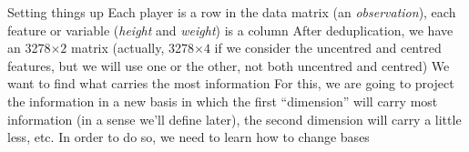 \documentclass[aspectratio=169]{beamer}\usepackage[]{graphicx}\usepackage[]{xcolor}
\makeatletter
\newcommand{\hlopt}[1]{\textcolor[rgb]{0,0,0}{#1}}%
\newcommand{\hldef}[1]{\textcolor[rgb]{0.345,0.345,0.345}{#1}}%
\newcommand{\hlkwb}[1]{\textcolor[rgb]{0.69,0.353,0.396}{#1}}%
\newcommand{\hlkwd}[1]{\textcolor[rgb]{0.737,0.353,0.396}{\textbf{#1}}}%
\newenvironment{kframe}{%
 \def\at@end@of@kframe{}%
 \ifinner\ifhmode%
  \def\at@end@of@kframe{\end{minipage}}%
  \begin{minipage}{\columnwidth}%
 \fi\fi%
 \def\FrameCommand##1{\hskip\@totalleftmargin \hskip-\fboxsep
 \colorbox{shadecolor}{##1}\hskip-\fboxsep
     \hskip-\linewidth \hskip-\@totalleftmargin \hskip\columnwidth}%
 \MakeFramed {\advance\hsize-\width
   \@totalleftmargin\z@ \linewidth\hsize
   \@setminipage}}%
 {\par\unskip\endMakeFramed%
 \at@end@of@kframe}
\newenvironment{knitrout}{}{} %
\makeatother
\begin{document}





\begin{frame}{Setting things up}
Each player is a row in the data matrix (an \emph{observation}), each feature or variable (\emph{height} and \emph{weight}) is a column
\vfill
After deduplication, we have an 3278$\times 2$ matrix (actually, 3278$\times 4$ if we consider the uncentred and centred features, but we will use one or the other, not both uncentred and centred)
\vfill
We want to find what carries the most information
\vfill
For this, we are going to project the information in a new basis in which the first ``dimension'' will carry most information (in a sense we'll define later), the second dimension will carry a little less, etc.
\vfill
In order to do so, we need to learn how to change bases
\end{frame}

\end{document}

